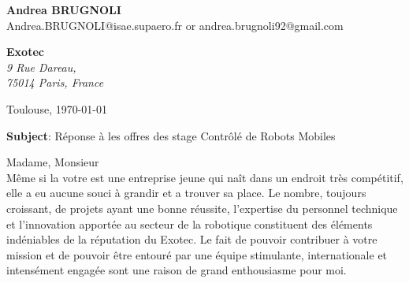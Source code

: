 \documentclass[11pt]{letter}
\begin{document}
 \sffamily
 \begin{flushleft}
 {\bfseries Andrea \textsc{BRUGNOLI}}\\[.35ex]
 Andrea.BRUGNOLI@isae.supaero.fr or andrea.brugnoli92@gmail.com
 \end{flushleft}
 \begin{flushright}
 {\bfseries Exotec}\\[.35ex]
 \small\itshape
 9 Rue Dareau, \\
 75014 Paris, France
 \end{flushright}
 \begin{flushright}
 Toulouse, \today 
 \end{flushright}
 \textbf{Subject}: Réponse à les offres des stage Contrôlé de Robots Mobiles

Madame, Monsieur \\
Même si la votre est une entreprise jeune qui naît dans un endroit très compétitif, elle a eu aucune souci à grandir et a trouver sa place.
Le nombre, toujours croissant, de projets ayant une bonne réussite, l'expertise du personnel technique et l'innovation apportée au secteur de  la robotique constituent des éléments indéniables de la réputation du Exotec. Le fait de pouvoir contribuer à votre mission et de pouvoir être entouré par une équipe stimulante, internationale et intensément engagée sont une raison de grand enthousiasme pour moi. 
\end{document}
